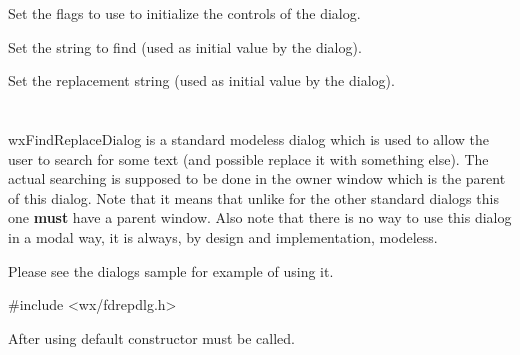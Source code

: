 
Set the flags to use to initialize the controls of the dialog.

\label{wxfindreplacedatasetfindstring}


Set the string to find (used as initial value by the dialog).

\label{wxfindreplacedatasetreplacestring}


Set the replacement string (used as initial value by the dialog).

\section{}\label{wxfindreplacedialog}

wxFindReplaceDialog is a standard modeless dialog which is used to allow the
user to search for some text (and possible replace it with something else).
The actual searching is supposed to be done in the owner window which is the
parent of this dialog. Note that it means that unlike for the other standard
dialogs this one {\bf must} have a parent window. Also note that there is no
way to use this dialog in a modal way, it is always, by design and
implementation, modeless.

Please see the dialogs sample for example of using it.


#include <wx/fdrepdlg.h>




\label{wxfindreplacedialogctor}



After using default constructor  
must be called.

